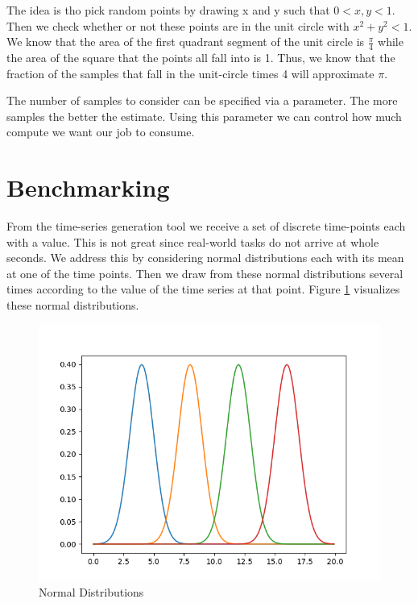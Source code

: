 The idea is tho pick random points by drawing x and y such that $0 < x, y < 1$. Then we check whether or not these points are in the unit circle with $x^2 + y^2 < 1$. We know that the area of the first quadrant segment of the unit circle is $\frac{\pi}{4}$ while the area of the square that the points all fall into is 1. Thus, we know that the fraction of the samples that fall in the unit-circle times 4 will approximate $\pi$.

The number of samples to consider can be specified via a parameter. The more samples the better the estimate. Using this parameter we can control how much compute we want our job to consume. 

\section{Benchmarking}

From the time-series generation tool we receive a set of discrete time-points each with a value. This is not great since real-world tasks do not arrive at whole seconds. We address this by considering normal distributions each with its mean at one of the time points. Then we draw from these normal distributions several times according to the value of the time series at that point. Figure \ref{fig:normal-dists} visualizes these normal distributions.

\begin{figure}
   \centering
   \includegraphics[scale=0.70]{figures/normal-dists.png}
\caption{Normal Distributions}    
\label{fig:normal-dists}
\end{figure}

